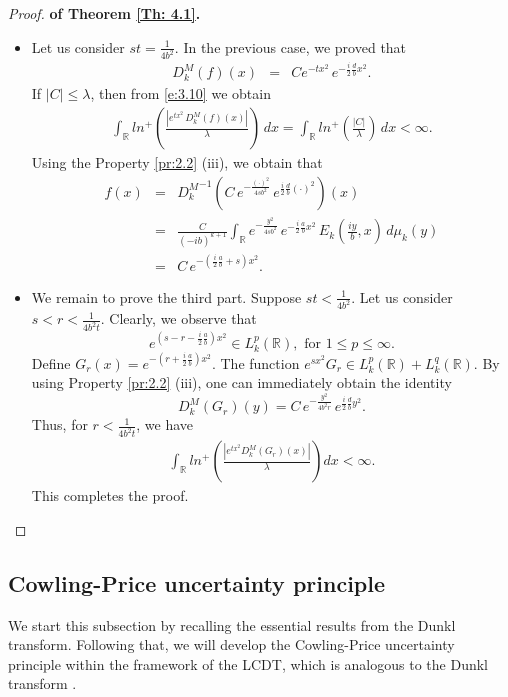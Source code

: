 \documentclass[12pt,a4paper,reqno]{amsproc}
\theoremstyle{definition}
\theoremstyle{remark}
\numberwithin{equation}{section}
\begin{document}
\begin{proof} {\bf of Theorem \ref{Th: 4.1}.}
\begin{itemize}
$$D_k^M(f)(z) = Ce^{-\frac{1}{4sb^2}z^2}e^{\frac{i}{2}\frac{d}{b}z^2}.$$ 
The assumptions  $st>\frac{1}{4b^2}$ and \eqref{4.4}, forces the constant $C$ to be zero. As a consequence of one-to-one of  $D_k^M$, we have  $f=0$.
 \item[$(ii).$] Let us consider $st=\frac{1}{4b^2}$. In the previous case, we proved that 
\begin{eqnarray}\label{e:3.10}
D_k^M(f)(x) &=& Ce^{-tx^2}\, e^{-\frac{i}{2}\frac{d}{b}x^2}.
\end{eqnarray} 
  If $|C|\le\lambda$, then from \eqref{e:3.10} we obtain
 \begin{eqnarray*}
\int_{\mathbb{R}}ln^+\left(\frac{|e^{tx^2}\, D_k^M(f)(x)|}{\lambda}\right)\, dx = \int_{\mathbb{R}}ln^+\left(\frac{|C|}{\lambda}\right)\, dx<\infty.
 \end{eqnarray*}
 Using the Property \ref{pr:2.2} (iii), we obtain that 
 \begin{eqnarray*}
     f(x) &=& {D_k^M}^{-1}\left(C\,e^{-\frac{(\cdot)^2}{4sb^2}}\,e^{\frac{i}{2}\frac{d}{b}(\cdot)^2}\right)(x)\\
     &=& \frac{C}{(-ib)^{k+1}}\int_{\mathbb{R}} e^{-\frac{y^2}{4sb^2}}\, e^{-\frac{i}{2}\frac{a}{b}x^2}\, E_k\left(\frac{iy}{b},x\right)\, d\mu_k(y)\\
     &=& C\, e^{-\left(\frac{i}{2}\frac{a}{b}+s\right)x^2}.
\end{eqnarray*}

\item[$(iii).$] We remain to prove the third part. Suppose $st<\frac{1}{4b^2}$. Let us consider $s<r<\frac{1}{4b^2t}$. Clearly, we observe that $$e^{(s-r-\frac{i}{2}\frac{a}{b})x^2} \in L^p_k(\mathbb{R}), \,\, \text{for} \,\,1\le p\le\infty.$$ Define $G_r(x) = e^{-(r+\frac{i}{2}\frac{a}{b})x^2}.$ The function   
$ e^{sx^2}G_r \in L^p_k(\mathbb{R})+L^{q}_k(\mathbb{R})$. By using Property \ref{pr:2.2} (iii), one can immediately obtain the identity $$D_k^M(G_r)(y) = C\, e^{-\frac{y^2}{4b^2r}}\, e^{\frac{i}{2}\frac{d}{b}y^2}.$$  Thus, for $r<\frac{1}{4b^2t}$, we have
\begin{eqnarray*}
\int_{\mathbb{R}} ln^+\left( \frac{|e^{tx^2} D_k^M(G_r)(x)|}{\lambda}\right) dx< \infty.
\end{eqnarray*}
This completes the proof.
 \end{itemize}
\end{proof}
\subsection{Cowling-Price uncertainty principle}
We start this subsection by recalling the essential results from the Dunkl transform. Following that, we will develop the Cowling-Price uncertainty principle within the framework of the LCDT, which is analogous to the Dunkl transform \cite{gallardo2004lp}.
\end{document}

